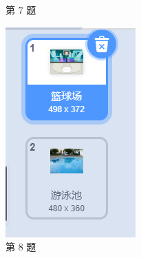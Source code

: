 \documentclass[10pt, a4paper]{article}
\begin{document}
\begin{enumerate}
\begin{figure}[htbp]
\begin{minipage}[t]{.08\textwidth}
                \caption*{第 7 题}
            \end{minipage}
            \begin{minipage}[t]{.12\textwidth}
                \centering
                \includegraphics[width=\textwidth]{8.png}
                \caption*{第 8 题}
            \end{minipage}
            \begin{minipage}[t]{.12\textwidth}
                \centering

\end{minipage}
\end{figure}
\end{enumerate}
\end{document}
